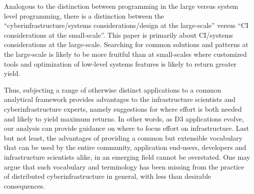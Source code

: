 







 Analogous to the distinction between programming in
the large versus system level programming, there is a distinction
between the ``cyberinfrastructure/systems considerations/design at the
large-scale'' versus ``CI considerations at the small-scale''. This
paper is primarily about CI/systems considerations at the large-scale.
Searching for common solutions and patterns at the large-scale is
likely to be more fruitful than at small-scales where customized tools
and optimization of low-level systems features is likely to return
greater yield.


Thus, subjecting a range of otherwise distinct applications to a
common analytical framework provides advantages to the infrastructure
scientists and cyberinfrastructure experts, namely suggestions for
where effort is both needed and likely to yield maximum returns. In
other words, as D3 applications evolve, our analysis can provide
guidance on where to focus effort on infrastructure.  Last but not
least, the advantages of providing a common but extensible vocabulary
that can be used by the entire community, application end-users,
developers and infrastructure scientists alike, in an emerging field
cannot be overstated. One may argue that such vocabulary and
terminology has been missing from the practice of distributed
cyberinfrastructure in general, with less than desirable consequences.

